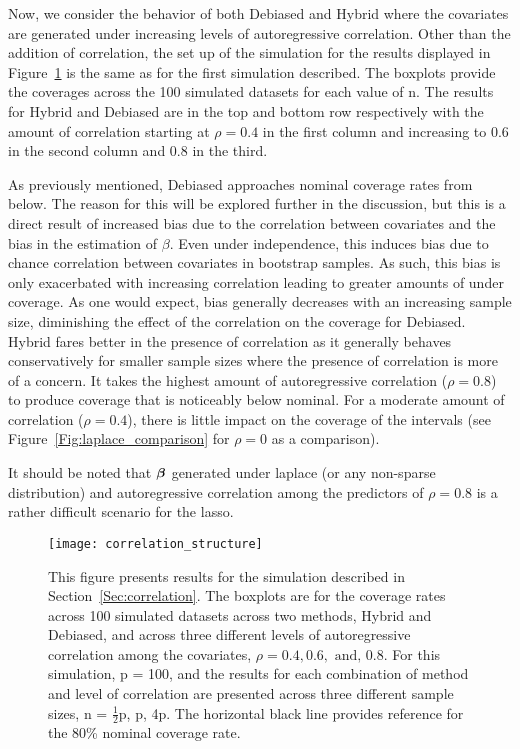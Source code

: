 Now, we consider the behavior of both Debiased and Hybrid where the covariates are generated under increasing levels of autoregressive correlation. Other than the addition of correlation, the set up of the simulation for the results displayed in Figure~\ref{Fig:correlation_structure} is the same as for the first simulation described. The boxplots provide the coverages across the 100 simulated datasets for each value of n. The results for Hybrid and Debiased are in the top and bottom row respectively with the amount of correlation starting at $\rho = 0.4$ in the first column and increasing to $0.6$ in the second column and $0.8$ in the third. 

As previously mentioned, Debiased approaches nominal coverage rates from below. The reason for this will be explored further in the discussion, but this is a direct result of increased bias due to the correlation between covariates and the bias in the estimation of $\beta$. Even under independence, this induces bias due to chance correlation between covariates in bootstrap samples. As such, this bias is only exacerbated with increasing correlation leading to greater amounts of under coverage. As one would expect, bias generally decreases with an increasing sample size, diminishing the effect of the correlation on the coverage for Debiased. Hybrid fares better in the presence of correlation as it generally behaves conservatively for smaller sample sizes where the presence of correlation is more of a concern. It takes the highest amount of autoregressive correlation ($\rho = 0.8$) to produce coverage that is noticeably below nominal. For a moderate amount of correlation ($\rho = 0.4$), there is little impact on the coverage of the intervals (see Figure~\ref{Fig:laplace_comparison} for $\rho = 0$ as a comparison).

It should be noted that $\boldsymbol{\beta}$ generated under laplace (or any non-sparse distribution) and autoregressive correlation among the predictors of $\rho = 0.8$ is a rather difficult scenario for the lasso. 

\begin{figure}[hbtp]
  \begin{center}
  \texttt{[image: correlation\_structure]}
  \caption{\label{Fig:correlation_structure} This figure presents results for the simulation described in Section~\ref{Sec:correlation}. The boxplots are for the coverage rates across 100 simulated datasets across two methods, Hybrid and Debiased, and across three different levels of autoregressive correlation among the covariates, $\rho = 0.4, 0.6, \text{ and, } 0.8$. For this simulation, p = 100, and the results for each combination of method and level of correlation are presented across three different sample sizes, n = $\frac{1}{2}$p, p, 4p. The horizontal black line provides reference for the 80\% nominal coverage rate.}
  \end{center}
\end{figure}

